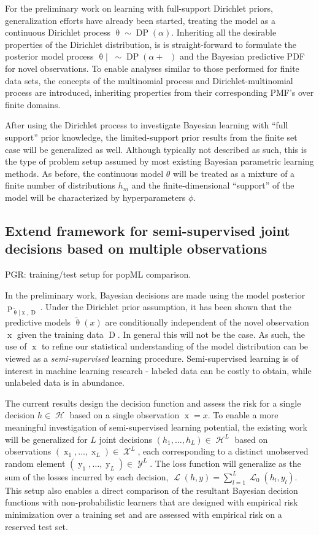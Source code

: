 \documentclass[12pt]{article}
\DeclareMathOperator{\xrm}{\mathrm{x}}
\DeclareMathOperator{\yrm}{\mathrm{y}}
\DeclareMathOperator{\Drm}{\mathrm{D}}
\DeclareMathOperator{\nbarrm}{\bar{\mathrm{n}}}
\DeclareMathOperator{\prm}{\mathrm{p}}
\DeclareMathOperator{\Xcal}{\mathcal{X}}
\DeclareMathOperator{\Ycal}{\mathcal{Y}}
\DeclareMathOperator{\Hcal}{\mathcal{H}}
\DeclareMathOperator{\Lcal}{\mathcal{L}}
\DeclareMathOperator{\DP}{\mathrm{DP}}
\begin{document}
For the preliminary work on learning with full-support Dirichlet priors, generalization efforts have already been started, treating the model as a continuous Dirichlet process $\uptheta \sim \DP(\alpha)$. Inheriting all the desirable properties of the Dirichlet distribution, is is straight-forward to formulate the posterior model process $\uptheta | \nbarrm \sim \DP(\alpha+\nbarrm)$ and the Bayesian predictive PDF for novel observations. To enable analyses similar to those performed for finite data sets, the concepts of the multinomial process and Dirichlet-multinomial process are introduced, inheriting properties from their corresponding PMF's over finite domains. 

After using the Dirichlet process to investigate Bayesian learning with ``full support'' prior knowledge, the limited-support prior results from the finite set case will be generalized as well. Although typically not described as such, this is the type of problem setup assumed by most existing Bayesian parametric learning methods. As before, the continuous model $\theta$ will be treated as a mixture of a finite number of distributions $h_m$ and the finite-dimensional ``support'' of the model will be characterized by hyperparameters $\phi$.




\subsection{Extend framework for semi-supervised joint decisions based on multiple observations}

PGR:  training/test setup for popML comparison. 

In the preliminary work, Bayesian decisions are made using the model posterior $\prm_{\tilde{\uptheta} | \xrm,\Drm}$. Under the Dirichlet prior assumption, it has been shown that the predictive models $\tilde{\uptheta}(x)$ are conditionally independent of the novel observation $\xrm$ given the training data $\Drm$. In general this will not be the case. As such, the use of $\xrm$ to refine our statistical understanding of the model distribution can be viewed as a \emph{semi-supervised} learning procedure. Semi-supervised learning is of interest in machine learning research - labeled data can be costly to obtain, while unlabeled data is in abundance. 

The current results design the decision function and assess the risk for a single decision $h \in \Hcal$ based on a single observation $\xrm = x$. To enable a more meaningful investigation of semi-supervised learning potential, the existing work will be generalized for $L$ joint decisions $(h_1,\ldots,h_L) \in \Hcal^L$ based on observations $(\xrm_1,\ldots,\xrm_L) \in \Xcal^L$, each corresponding to a distinct unobserved random element $(\yrm_1,\ldots,\yrm_L) \in \Ycal^L$. The loss function will generalize as the sum of the losses incurred by each decision, $\Lcal(h,y) = \sum_{l=1}^L \Lcal_0(h_l,y_l)$. This setup also enables a direct comparison of the resultant Bayesian decision functions with non-probabilistic learners that are designed with empirical risk minimization over a training set and are assessed with empirical risk on a reserved test set.
\end{document}
